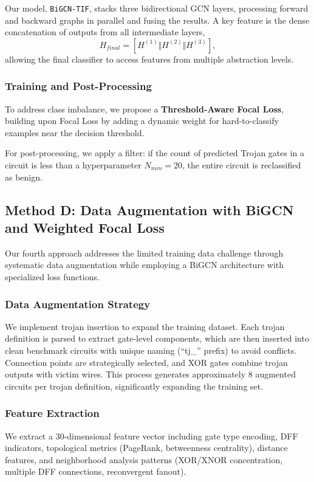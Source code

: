 \documentclass[conference]{IEEEtran}
\begin{document}
Our model, \texttt{BiGCN-TIF}, stacks three bidirectional GCN layers, processing forward and backward graphs in parallel and fusing the results. A key feature is the dense concatenation of outputs from all intermediate layers, \[ H_{final} = [H^{(1)} \Vert H^{(2)} \Vert H^{(3)}], \] allowing the final classifier to access features from multiple abstraction levels.

\subsubsection{Training and Post-Processing}
To address class imbalance, we propose a \textbf{Threshold-Aware Focal Loss}, building upon Focal Loss \cite{Lin2017FocalLoss} by adding a dynamic weight for hard-to-classify examples near the decision threshold.

For post-processing, we apply a filter: if the count of predicted Trojan gates in a circuit is less than a hyperparameter $N_{min}=20$, the entire circuit is reclassified as benign.

\FloatBarrier
\subsection{Method D: Data Augmentation with BiGCN and Weighted Focal Loss}
\label{sec:method_D}
Our fourth approach addresses the limited training data challenge through systematic data augmentation while employing a BiGCN architecture with specialized loss functions.

\subsubsection{Data Augmentation Strategy}
We implement trojan insertion to expand the training dataset. Each trojan definition is parsed to extract gate-level components, which are then inserted into clean benchmark circuits with unique naming (``tj\_'' prefix) to avoid conflicts. Connection points are strategically selected, and XOR gates combine trojan outputs with victim wires. This process generates approximately 8 augmented circuits per trojan definition, significantly expanding the training set.

\subsubsection{Feature Extraction}
We extract a 30-dimensional feature vector including gate type encoding, DFF indicators, topological metrics (PageRank, betweenness centrality), distance features, and neighborhood analysis patterns (XOR/XNOR concentration, multiple DFF connections, reconvergent fanout).
\end{document}
